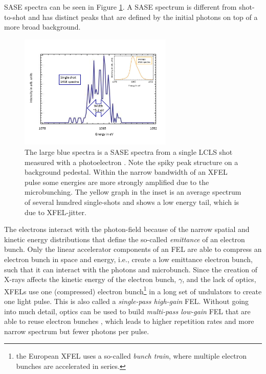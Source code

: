 SASE spectra can be seen in Figure \ref{fig:SASE-spectra}. A SASE spectrum is different from shot-to-shot and has distinct peaks that are defined by the initial photons on top of a more broad background.
\begin{figure}
	\centering
		\includegraphics[width=0.65\textwidth]{images/SASE-spectra.png}
	\caption[SASE single-shot and average spectra]{The large blue spectra is a SASE spectra from a single LCLS shot measured with a photoelectron \citep[see][]{Bucher-2014-Unpublished}. Note the spiky peak structure on a background pedestal. Within the narrow bandwidth of an XFEL pulse some energies are more strongly amplified due to the microbunching. The yellow graph in the inset is an average spectrum of several hundred single-shots and shows a low energy tail, which is due to XFEL-jitter.}
	\label{fig:SASE-spectra}
\end{figure}
The electrons interact with the photon-field because of the narrow spatial and kinetic energy distributions that define the so-called \textit{emittance} of an electron bunch. Only the linear accelerator components of an FEL are able to compress an electron bunch in space and energy, i.e., create a low emittance electron bunch, such that it can interact with the photons and microbunch. Since the creation of X-rays affects the kinetic energy of the electron bunch, $\gamma$, and the lack of optics, XFELs use one (compressed) electron bunch\footnote{the European XFEL uses a so-called \textit{bunch train}, where multiple electron bunches are accelerated in series.} in a long set of undulators to create one light pulse. This is also called a \textit{single-pass high-gain} FEL. Without going into much detail, optics can be used to build \textit{multi-pass low-gain} FEL that are able to reuse electron bunches \citep{Kim-2008-PRL}, which leads to higher repetition rates and more narrow spectrum but fewer photons per pulse.
%
%
%
%
